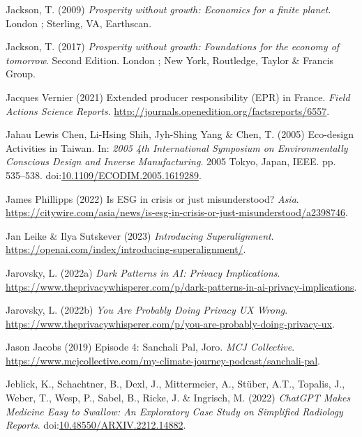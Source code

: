 \documentclass[
  letterpaper,
  DIV=11,
  numbers=noendperiod]{scrartcl}
\newlength{\cslhangindent}
\newenvironment{CSLReferences}[2] %
 {\begin{list}{}{%
  \setlength{\itemindent}{0pt}
  \setlength{\leftmargin}{0pt}
  \setlength{\parsep}{0pt}
  \ifodd #1
   \setlength{\leftmargin}{\cslhangindent}
   \setlength{\itemindent}{-1\cslhangindent}
  \fi
  \setlength{\itemsep}{#2\baselineskip}}}
 {\end{list}}
\begin{document}
\begin{CSLReferences}{0}{1}
Jackson, T. (2009) \emph{Prosperity without growth: Economics for a
finite planet}. London ; Sterling, VA, Earthscan.

Jackson, T. (2017) \emph{Prosperity without growth: Foundations for the
economy of tomorrow}. Second Edition. London ; New York, Routledge,
Taylor \& Francis Group.

Jacques Vernier (2021) Extended producer responsibility ({EPR}) in
{France}. \emph{Field Actions Science Reports}.
\url{http://journals.openedition.org/factsreports/6557}.

Jahau Lewis Chen, Li-Hsing Shih, Jyh-Shing Yang \& Chen, T. (2005)
Eco-design {Activities} in {Taiwan}. In: \emph{2005 4th {International
Symposium} on {Environmentally Conscious Design} and {Inverse
Manufacturing}}. 2005 Tokyo, Japan, IEEE. pp. 535--538.
doi:\href{https://doi.org/10.1109/ECODIM.2005.1619289}{10.1109/ECODIM.2005.1619289}.

James Phillipps (2022) Is {ESG} in crisis or just misunderstood?
\emph{Asia}.
\url{https://citywire.com/asia/news/is-esg-in-crisis-or-just-misunderstood/a2398746}.

Jan Leike \& Ilya Sutskever (2023) \emph{Introducing {Superalignment}}.
\url{https://openai.com/index/introducing-superalignment/}.

Jarovsky, L. (2022a) \emph{Dark {Patterns} in {AI}: {Privacy
Implications}}.
\url{https://www.theprivacywhisperer.com/p/dark-patterns-in-ai-privacy-implications}.

Jarovsky, L. (2022b) \emph{You {Are Probably Doing Privacy UX Wrong}}.
\url{https://www.theprivacywhisperer.com/p/you-are-probably-doing-privacy-ux}.

Jason Jacobs (2019) Episode 4: {Sanchali Pal}, {Joro}. \emph{MCJ
Collective}.
\url{https://www.mcjcollective.com/my-climate-journey-podcast/sanchali-pal}.

Jeblick, K., Schachtner, B., Dexl, J., Mittermeier, A., Stüber, A.T.,
Topalis, J., Weber, T., Wesp, P., Sabel, B., Ricke, J. \& Ingrisch, M.
(2022) \emph{{ChatGPT Makes Medicine Easy} to {Swallow}: {An Exploratory
Case Study} on {Simplified Radiology Reports}}.
doi:\href{https://doi.org/10.48550/ARXIV.2212.14882}{10.48550/ARXIV.2212.14882}.


\end{CSLReferences}
\end{document}
